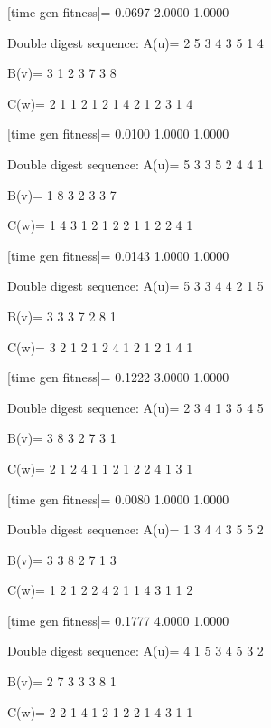 [time gen fitness]=
    0.0697    2.0000    1.0000

Double digest sequence:
A(u)=
     2     5     3     4     3     5     1     4

B(v)=
     3     1     2     3     7     3     8

C(w)=
     2     1     1     2     1     2     1     4     2     1     2     3     1     4

[time gen fitness]=
    0.0100    1.0000    1.0000

Double digest sequence:
A(u)=
     5     3     3     5     2     4     4     1

B(v)=
     1     8     3     2     3     3     7

C(w)=
     1     4     3     1     2     1     2     2     1     1     2     2     4     1

[time gen fitness]=
    0.0143    1.0000    1.0000

Double digest sequence:
A(u)=
     5     3     3     4     4     2     1     5

B(v)=
     3     3     3     7     2     8     1

C(w)=
     3     2     1     2     1     2     4     1     2     1     2     1     4     1

[time gen fitness]=
    0.1222    3.0000    1.0000

Double digest sequence:
A(u)=
     2     3     4     1     3     5     4     5

B(v)=
     3     8     3     2     7     3     1

C(w)=
     2     1     2     4     1     1     2     1     2     2     4     1     3     1

[time gen fitness]=
    0.0080    1.0000    1.0000

Double digest sequence:
A(u)=
     1     3     4     4     3     5     5     2

B(v)=
     3     3     8     2     7     1     3

C(w)=
     1     2     1     2     2     4     2     1     1     4     3     1     1     2

[time gen fitness]=
    0.1777    4.0000    1.0000

Double digest sequence:
A(u)=
     4     1     5     3     4     5     3     2

B(v)=
     2     7     3     3     3     8     1

C(w)=
     2     2     1     4     1     2     1     2     2     1     4     3     1     1

